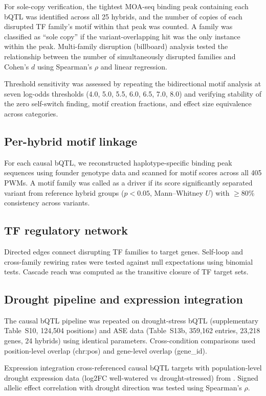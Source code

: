 \documentclass[11pt,a4paper]{article}
\begin{document}
For sole-copy verification, the tightest MOA-seq binding peak containing each
bQTL was identified across all 25 hybrids, and the number of copies of each
disrupted TF family's motif within that peak was counted. A family was
classified as ``sole copy'' if the variant-overlapping hit was the only
instance within the peak. Multi-family disruption (billboard) analysis tested
the relationship between the number of simultaneously disrupted families and
Cohen's $d$ using Spearman's $\rho$ and linear regression.

Threshold sensitivity was assessed by repeating the bidirectional motif
analysis at seven log-odds thresholds (4.0, 5.0, 5.5, 6.0, 6.5, 7.0, 8.0)
and verifying stability of the zero self-switch finding, motif creation
fractions, and effect size equivalence across categories.

\subsection{Per-hybrid motif linkage}
For each causal bQTL, we reconstructed haplotype-specific binding peak
sequences using founder genotype data and scanned for motif scores across
all 405 PWMs. A motif family was called as a driver if its score significantly
separated variant from reference hybrid groups ($p < 0.05$, Mann--Whitney $U$)
with $\geq$80\% consistency across variants.

\subsection{TF regulatory network}
Directed edges connect disrupting TF families to target genes. Self-loop and
cross-family rewiring rates were tested against null expectations using
binomial tests. Cascade reach was computed as the transitive closure of TF
target sets.

\subsection{Drought pipeline and expression integration}
The causal bQTL pipeline was repeated on drought-stress bQTL (supplementary
Table~S10, 124,504 positions) and ASE data (Table~S13b, 359,162 entries,
23,218 genes, 24 hybrids) using identical parameters. Cross-condition
comparisons used position-level overlap (chr:pos) and gene-level overlap
(gene\_id).

Expression integration cross-referenced causal bQTL targets with
population-level drought expression data (log2FC well-watered vs
drought-stressed) from \citet{engelhorn2025}. Signed allelic effect
correlation with drought direction was tested using Spearman's $\rho$.
\end{document}
